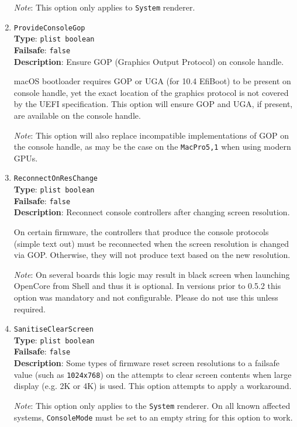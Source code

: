 \documentclass[]{article}
\begin{document}
\begin{enumerate}
  \emph{Note}: This option only applies to \texttt{System} renderer.

\item
  \texttt{ProvideConsoleGop}\\
  \textbf{Type}: \texttt{plist\ boolean}\\
  \textbf{Failsafe}: \texttt{false}\\
  \textbf{Description}: Ensure GOP (Graphics Output Protocol) on console handle.

  macOS bootloader requires GOP or UGA (for 10.4 EfiBoot) to be present on console
  handle, yet the exact location of the graphics protocol is not covered by the
  UEFI specification. This option will ensure GOP and UGA, if present, are available
  on the console handle.

  \emph{Note}: This option will also replace incompatible implementations of GOP on the
  console handle, as may be the case on the \texttt{MacPro5,1} when using modern GPUs.

\item
  \texttt{ReconnectOnResChange}\\
  \textbf{Type}: \texttt{plist\ boolean}\\
  \textbf{Failsafe}: \texttt{false}\\
  \textbf{Description}: Reconnect console controllers after changing screen resolution.

  On certain firmware, the controllers that produce the console protocols (simple text out)
  must be reconnected when the screen resolution is changed via GOP. Otherwise, they will
  not produce text based on the new resolution.

  \emph{Note}: On several boards this logic may result in black screen when launching
  OpenCore from Shell and thus it is optional. In versions prior to 0.5.2 this option
  was mandatory and not configurable. Please do not use this unless required.

\item
  \texttt{SanitiseClearScreen}\\
  \textbf{Type}: \texttt{plist\ boolean}\\
  \textbf{Failsafe}: \texttt{false}\\
  \textbf{Description}: Some types of firmware reset screen resolutions to a failsafe
  value (such as \texttt{1024x768}) on the attempts to clear screen contents
  when large display (e.g. 2K or 4K) is used. This option attempts to apply
  a workaround.

  \emph{Note}: This option only applies to the \texttt{System} renderer.
   On all known affected systems, \texttt{ConsoleMode} must be set to
   an empty string for this option to work.


\end{enumerate}
\end{document}
